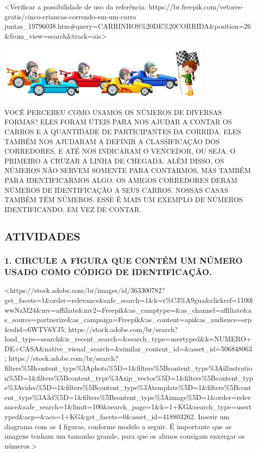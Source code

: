 \textless{}Verificar a possibilidade de uso da referência:
https://br.freepik.com/vetores-gratis/cinco-criancas-correndo-em-um-carro
juntas\_19796038.htm\#query=CARRINHOS\%20DE\%20CORRIDA\&position=26\&from\_view=search\&track=ais\textgreater{}

\includegraphics[width=4.15174in,height=1.06137in]{media/image1.jpg}

VOCÊ PERCEBEU COMO USAMOS OS NÚMEROS DE DIVERSAS FORMAS? ELES FORAM
ÚTEIS PARA NOS AJUDAR A CONTAR OS CARROS E A QUANTIDADE DE PARTICIPANTES
DA CORRIDA. ELES TAMBÉM NOS AJUDARAM A DEFINIR A CLASSIFICAÇÃO DOS
CORREDORES, E ATÉ NOS INDICARAM O VENCEDOR, OU SEJA, O PRIMEIRO A CRUZAR
A LINHA DE CHEGADA. ALÉM DISSO, OS NÚMEROS NÃO SERVEM SOMENTE PARA
CONTARMOS, MAS TAMBÉM PARA IDENTIFICARMOS ALGO. OS
AMIGOS CORREDORES DERAM NÚMEROS DE IDENTIFICAÇÃO A SEUS CARROS.
NOSSAS CASAS TAMBÉM TÊM NÚMEROS. ESSE É MAIS UM EXEMPLO DE
NÚMEROS IDENTIFICANDO, EM VEZ DE CONTAR.

\subsection{ATIVIDADES}\label{atividades}

\subsubsection{1. CIRCULE A FIGURA QUE CONTÉM UM NÚMERO USADO COMO
CÓDIGO DE
IDENTIFICAÇÃO.}\label{circule-a-figura-que-contuxe9m-um-nuxfamero-usado-como-cuxf3digo-de-identificauxe7uxe3o.}

\textless{}https://stock.adobe.com/br/images/id/363300782?get\_facets=1\&order=relevance\&safe\_search=1\&k=r\%C3\%A9gua\&clickref=1100lwwNzM24\&mv=affiliate\&mv2=Freepik\&as\_camptype=\&as\_channel=affiliate\&as\_source=partnerize\&as\_campaign=Freepik\&as\_content=api\&as\_audience=srp\&sdid=6WTV6YJ5;
https://stock.adobe.com/br/search?load\_type=search\&is\_recent\_search=\&search\_type=usertyped\&k=NUMERO+DE+CASA\&native\_visual\_search=\&similar\_content\_id=\&asset\_id=506848063;
https://stock.adobe.com/br/search?filters\%5Bcontent\_type\%3Aphoto\%5D=1\&filters\%5Bcontent\_type\%3Aillustration\%5D=1\&filters\%5Bcontent\_type\%3Azip\_vector\%5D=1\&filters\%5Bcontent\_type\%3Avideo\%5D=1\&filters\%5Bcontent\_type\%3Atemplate\%5D=1\&filters\%5Bcontent\_type\%3A3d\%5D=1\&filters\%5Bcontent\_type\%3Aimage\%5D=1\&order=relevance\&safe\_search=1\&limit=100\&search\_page=1\&k=1+KG\&search\_type=usertyped\&acp=\&aco=1+KG\&get\_facets=0\&asset\_id=418803262.
Inserir um diagrama com as 4 figuras, conforme modelo a seguir. É
importante que as imagens tenham um tamanho grande, para que os alunos
consigam enxergar os números.\textgreater{}

